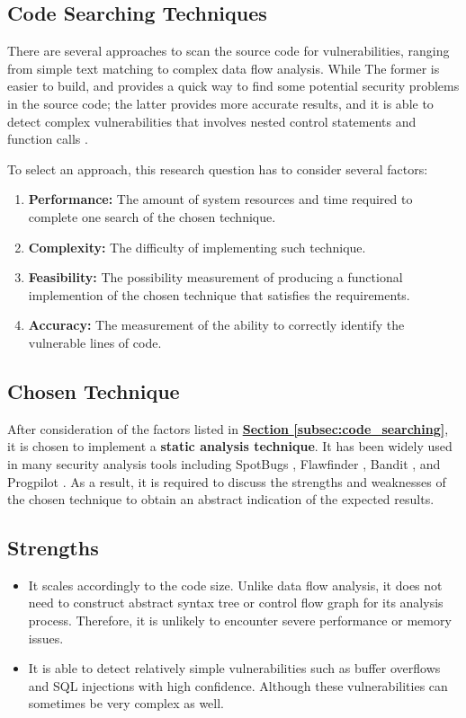 \documentclass[12pt, a4paper]{report}
\begin{document}
\subsection{Code Searching Techniques}
There are several approaches to scan the source code for vulnerabilities, ranging from simple text
matching to complex data flow analysis. While The former is easier to build, and provides a quick
way to find some potential security problems in the source code; the latter provides more accurate
results, and it is able to detect complex vulnerabilities that involves nested control statements
and function calls \cite{castro_2006}.

To select an approach, this research question has to consider several factors:
\begin{enumerate} \label{subsec:code_searching}
  \item \textbf{Performance:} The amount of system resources and time required to complete one
  search of the chosen technique.
  \item \textbf{Complexity:} The difficulty of implementing such technique.
  \item \textbf{Feasibility:} The possibility measurement of producing a functional implemention of
  the chosen technique that satisfies the requirements.
  \item \textbf{Accuracy:} The measurement of the ability to correctly identify the vulnerable lines
  of code.
\end{enumerate}

\subsection{Chosen Technique}
After consideration of the factors listed in \hyperref[subsec:code_searching]{\textbf{Section
\ref*{subsec:code_searching}}}, it is chosen to implement a \textbf{static analysis technique}. It
has been widely used in many security analysis tools including SpotBugs \cite{spotbugs}, Flawfinder
\cite{flawfinder}, Bandit \cite{bandit}, and Progpilot \cite{progpilot}. As a result, it is required
to discuss the strengths and weaknesses of the chosen technique to obtain an abstract indication of
the expected results.

\subsection*{Strengths}
\begin{itemize}
  \item It scales accordingly to the code size. Unlike data flow analysis, it does not need to
  construct abstract syntax tree or control flow graph for its analysis process. Therefore, it is
  unlikely to encounter severe performance or memory issues.
  \item It is able to detect relatively simple vulnerabilities such as buffer overflows and SQL
  injections with high confidence. Although these vulnerabilities can sometimes be very complex as
  well.
\end{itemize}
\end{document}

